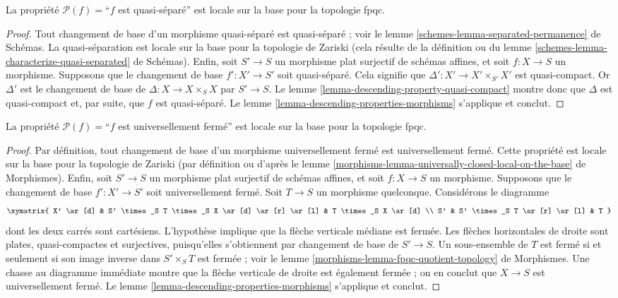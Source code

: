 \begin{lemma}
\label{lemma-descending-property-quasi-separated}
La propriété $\mathcal{P}(f) =$``$f$ est quasi-séparé'' est locale sur la
base pour la topologie fpqc.
\end{lemma}

\begin{proof}
Tout changement de base d'un morphisme quasi-séparé est quasi-séparé ; voir
le lemme \ref{schemes-lemma-separated-permanence} de Schémas. La quasi-séparation
est locale sur la base pour la topologie de Zariski (cela résulte de la
définition ou du lemme
\ref{schemes-lemma-characterize-quasi-separated} de Schémas). Enfin, soit $S' \to S$
un morphisme plat surjectif de schémas affines, et soit $f : X \to S$ un
morphisme. Supposons que le changement de base $f' : X' \to S'$ soit
quasi-séparé. Cela signifie que
$\Delta' : X' \to X'\times_{S'} X'$ est quasi-compact. Or $\Delta'$ est le
changement de base de $\Delta : X \to X \times_S X$ par $S' \to S$.
Le lemme \ref{lemma-descending-property-quasi-compact} montre donc que
$\Delta$ est quasi-compact et, par suite, que $f$ est quasi-séparé.
Le lemme \ref{lemma-descending-properties-morphisms} s'applique et conclut.
\end{proof}

\begin{lemma}
\label{lemma-descending-property-universally-closed}
La propriété $\mathcal{P}(f) =$``$f$ est universellement fermé'' est locale
sur la base pour la topologie fpqc.
\end{lemma}

\begin{proof}
Par définition, tout changement de base d'un morphisme universellement fermé
est universellement fermé. Cette propriété est locale sur la base pour la
topologie de Zariski (par définition ou d'après le lemme
\ref{morphisms-lemma-universally-closed-local-on-the-base} de Morphismes). Enfin, soit
$S' \to S$ un morphisme plat surjectif de schémas affines, et soit
$f : X \to S$ un morphisme. Supposons que le changement de base
$f' : X' \to S'$ soit universellement fermé. Soit $T \to S$ un morphisme
quelconque. Considérons le diagramme
$$
\xymatrix{
X' \ar[d] &
S' \times_S T \times_S X \ar[d] \ar[r] \ar[l] &
T \times_S X \ar[d] \\
S' &
S' \times_S T \ar[r] \ar[l] &
T
}
$$
dont les deux carrés sont cartésiens. L'hypothèse implique que la flèche
verticale médiane est fermée. Les flèches horizontales de droite sont plates,
quasi-compactes et surjectives, puisqu'elles s'obtiennent par changement de
base de $S' \to S$. Un sous-ensemble de $T$ est fermé si et seulement si son
image inverse dans $S' \times_S T$ est fermée ; voir le lemme
\ref{morphisms-lemma-fpqc-quotient-topology} de Morphismes. Une chasse au diagramme
immédiate montre que la flèche verticale de droite est également fermée ; on
en conclut que $X \to S$ est universellement fermé. Le lemme
\ref{lemma-descending-properties-morphisms} s'applique et conclut.
\end{proof}

